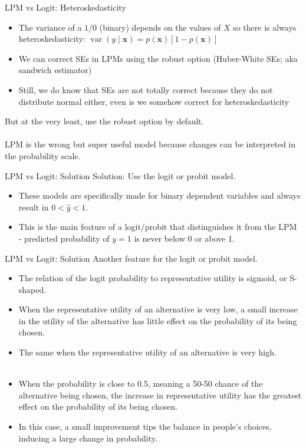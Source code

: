 \begin{frame}{LPM vs Logit: Heteroskedasticity}

\begin{itemize}
\item The variance of a $1 / 0$ (binary) depends on the values of $X$ so there is always heteroskedasticity: $\operatorname{var}(y \mid \mathbf{x})=p(\mathbf{x})[1-p(\mathbf{x})]$
\item We can correct SEs in LPMs using the robust option (Huber-White SEs; aka sandwich estimator)
\item Still, we do know that SEs are not totally correct because they do not distribute normal either, even is we somehow correct for heteroskedasticity
\end{itemize}
But at the very least, use the robust option by default.
\\ \hspace*{\fill} \\
LPM is the wrong but super useful model because changes can be interpreted in the probability scale.

\end{frame}






\begin{frame}{LPM vs Logit: Solution}
Solution: Use the logit or probit model.
\begin{itemize}
\item These models are specifically made for binary dependent variables and always result in $0<\hat{y}<1$.
\item This is the main feature of a logit/probit that distinguishes it from the LPM - predicted probability of $y=1$ is never below 0 or above 1.
\end{itemize}
\end{frame}


\begin{frame}{LPM vs Logit: Solution}
Another feature for the logit or probit model.
\begin{itemize}
\item The relation of the logit probability to representative utility is sigmoid, or S-shaped.
\item When the representative utility of an alternative is very low, a small increase in the utility of the alternative has little effect on the probability of its being chosen.
\item The same when the representative utility of an alternative is very high.
\\ \hspace*{\fill} \\
\item When the probability is close to 0.5, meaning a 50-50 chance of the alternative being chosen, the increase in representative utility has the greatest effect on the probability of its being chosen.
\item In this case, a small improvement tips the balance in people's choices, inducing a large change in probability.
\end{itemize}

\end{frame}



